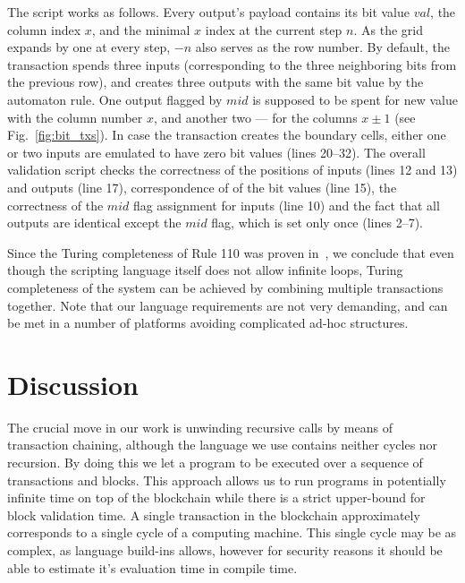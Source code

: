 \documentclass[runningheads]{llncs}
\begin{document}
	The script works as follows. Every output's payload contains its bit value
    $val$, 
    the column index $x$, and the minimal $x$ index at the current step $n$.
    As the
    grid expands by one at every step, $-n$ also serves as the row number. By
    default, the transaction spends three inputs (corresponding to the three
    neighboring bits from the previous row), and creates three outputs with the same
    bit value by the automaton rule. One output flagged by $mid$ is supposed to be
    spent for new value with the column number $x$, and another two --- for the
    columns $x\pm 1$ (see Fig.~\ref{fig:bit_txs}). In case the transaction creates the
    boundary cells, either one or two inputs are emulated to have zero bit values
    (lines 20--32).  The overall validation script checks the correctness of the
    positions of inputs (lines 12 and 13) and outputs (line 17), correspondence of
    of the bit values (line 15), the correctness of the $mid$  flag assignment for
    inputs (line 10) and the fact that all outputs are identical except the $mid$
    flag, which is set only once (lines 2--7).

    Since the Turing completeness of Rule 110 was proven
    in~\cite{cook2004universality}, we conclude that even though the scripting
    language itself does not allow infinite loops, Turing completeness of the
    system can be achieved by combining multiple transactions together. Note
    that our language requirements are not very demanding, and can be met in a 
    number of platforms avoiding complicated ad-hoc structures.

    \section{Discussion}
    \label{section3}

    The crucial move in our work is unwinding recursive calls by means
    of transaction chaining, although the language we use contains neither cycles nor
    recursion. By doing this we let a program to be executed over a sequence of
    transactions and blocks. This approach allows us to run programs in potentially infinite time on top 
    of the blockchain while there is a strict upper-bound for block validation time. %
    A single transaction in the blockchain approximately corresponds to a single
    cycle of a computing machine.
    This single cycle may be as complex, as language build-ins allows, however for
    security reasons it should be able to estimate it's evaluation time in compile time.
\end{document}
